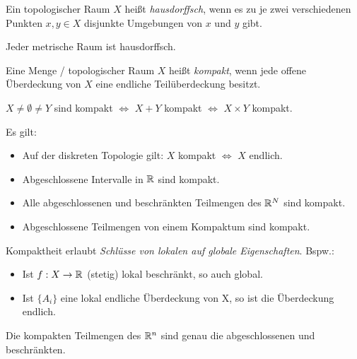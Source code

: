 \begin{defi}[Hausdorffsch]
Ein topologischer Raum $X$ heißt \emph{hausdorffsch}, wenn es zu je zwei verschiedenen Punkten $x, y \in X$ disjunkte Umgebungen von $x$ und $y$ gibt.
\end{defi}

\begin{bem} Jeder metrische Raum ist hausdorffsch. \\
\end{bem}

\begin{defi}[Kompaktheit]
Eine Menge / topologischer Raum $X$ heißt \emph{kompakt}, wenn jede offene Überdeckung von $X$ eine endliche Teilüberdeckung besitzt.
\end{defi}

\begin{bem} $X \neq \emptyset \neq Y$ sind kompakt $\Leftrightarrow$ $X + Y$ kompakt $\Leftrightarrow$ $X \times Y$ kompakt.
\end{bem}

\begin{bsp} Es gilt:
\begin{itemize}
\item Auf der diskreten Topologie gilt: $X$ kompakt $\Leftrightarrow$ $X$ endlich.
\item Abgeschlossene Intervalle in $\mathbb R$ sind kompakt.
\item Alle abgeschlossenen und beschränkten Teilmengen des $\mathbb R^N$ sind kompakt.
\item Abgeschlossene Teilmengen von einem Kompaktum sind kompakt.
\end{itemize}
\end{bsp}

\begin{bem}
Kompaktheit erlaubt \emph{Schlüsse von lokalen auf globale Eigenschaften}. Bspw.:
\begin{itemize}
	\item Ist $f: X \to \mathbb R$ (stetig) lokal beschränkt, so auch global.
	\item Ist $\{A_i\}$ eine lokal endliche Überdeckung von X, so ist die Überdeckung endlich. \\
\end{itemize}
\end{bem}

\begin{satz} Die kompakten Teilmengen des $\mathbb R^n$ sind genau die abgeschlossenen und beschränkten.
\end{satz}

